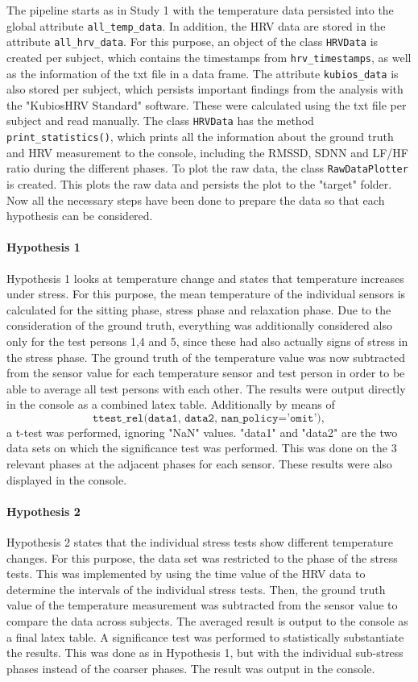 The pipeline starts as in Study 1 with the temperature data persisted into the global attribute \texttt{all\_temp\_data}.
In addition, the HRV data are stored in the attribute \texttt{all\_hrv\_data}.
For this purpose, an object of the class \texttt{HRVData} is created per subject, which contains the timestamps from \texttt{hrv\_timestamps}, as well as the information of the txt file in a data frame.
The attribute \texttt{kubios\_data} is also stored per subject, which persists important findings from the analysis with the "KubiosHRV Standard" software.
These were calculated using the txt file per subject and read manually.
The class \texttt{HRVData} has the method \texttt{print\_statistics()}, which prints all the information about the ground truth and HRV measurement to the console, including the RMSSD, SDNN and LF/HF ratio during the different phases.
To plot the raw data, the class \texttt{RawDataPlotter} is created.
This plots the raw data and persists the plot to the "target" folder.
Now all the necessary steps have been done to prepare the data so that each hypothesis can be considered. 

\paragraph{Hypothesis 1}
Hypothesis 1 looks at temperature change and states that temperature increases under stress.
For this purpose, the mean temperature of the individual sensors is calculated for the sitting phase, stress phase and relaxation phase. 
Due to the consideration of the ground truth, everything was additionally considered also only for the test persons 1,4 and 5, since these had also actually signs of stress in the stress phase.
The ground truth of the temperature value was now subtracted from the sensor value for each temperature sensor and test person in order to be able to average all test persons with each other.
The results were output directly in the console as a combined latex table.
Additionally by means of 
\[
    \texttt{ttest\_rel(data1, data2, nan\_policy='omit')},
\]
a t-test was performed, ignoring "NaN" values. 
"data1" and "data2" are the two data sets on which the significance test was performed. 
This was done on the 3 relevant phases at the adjacent phases for each sensor. 
These results were also displayed in the console.

\paragraph{Hypothesis 2}
Hypothesis 2 states that the individual stress tests show different temperature changes.
For this purpose, the data set was restricted to the phase of the stress tests. 
This was implemented by using the time value of the HRV data to determine the intervals of the individual stress tests.
Then, the ground truth value of the temperature measurement was subtracted from the sensor value to compare the data across subjects. 
The averaged result is output to the console as a final latex table.
A significance test was performed to statistically substantiate the results.
This was done as in Hypothesis 1, but with the individual sub-stress phases instead of the coarser phases.
The result was output in the console.